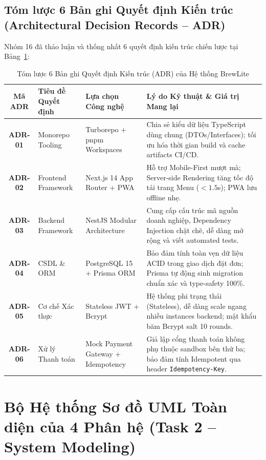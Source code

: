 \documentclass[a4paper]{article}
\begin{document}
\subsection{Tóm lược 6 Bản ghi Quyết định Kiến trúc (Architectural Decision Records -- ADR)}
Nhóm 16 đã thảo luận và thống nhất 6 quyết định kiến trúc chiến lược tại Bảng~\ref{tab:adrs}:

\begin{table}[H]
\centering
\small
\begin{tabular}{|c|>{\raggedright\arraybackslash}p{2.5cm}|>{\raggedright\arraybackslash}p{3.8cm}|>{\raggedright\arraybackslash}p{6.8cm}|}
\hline
\textbf{Mã ADR} & \textbf{Tiêu đề Quyết định} & \textbf{Lựa chọn Công nghệ} & \textbf{Lý do Kỹ thuật \& Giá trị Mang lại} \\ \hline
\textbf{ADR-01} & Monorepo Tooling & Turborepo + pnpm Workspaces & Chia sẻ kiểu dữ liệu TypeScript dùng chung (DTOs/Interfaces); tối ưu hóa thời gian build và cache artifacts CI/CD. \\ \hline
\textbf{ADR-02} & Frontend Framework & Next.js 14 App Router + PWA & Hỗ trợ Mobile-First mượt mà; Server-side Rendering tăng tốc độ tải trang Menu ($<1.5$s); PWA lưu offline nhẹ. \\ \hline
\textbf{ADR-03} & Backend Framework & NestJS Modular Architecture & Cung cấp cấu trúc mã nguồn doanh nghiệp, Dependency Injection chặt chẽ, dễ dàng mở rộng và viết automated tests. \\ \hline
\textbf{ADR-04} & CSDL \& ORM & PostgreSQL 15 + Prisma ORM & Bảo đảm tính toàn vẹn dữ liệu ACID trong giao dịch đặt đơn; Prisma tự động sinh migration chuẩn xác và type-safety 100\%. \\ \hline
\textbf{ADR-05} & Cơ chế Xác thực & Stateless JWT + Bcrypt & Hệ thống phi trạng thái (Stateless), dễ dàng scale ngang nhiều instances backend; mật khẩu băm Bcrypt salt 10 rounds. \\ \hline
\textbf{ADR-06} & Xử lý Thanh toán & Mock Payment Gateway + Idempotency & Giả lập cổng thanh toán không phụ thuộc sandbox bên thứ ba; bảo đảm tính Idempotent qua header \texttt{Idempotency-Key}. \\ \hline
\end{tabular}
\caption{Tóm lược 6 Bản ghi Quyết định Kiến trúc (ADR) của Hệ thống BrewLite}
\label{tab:adrs}
\end{table}

\newpage
\section{Bộ Hệ thống Sơ đồ UML Toàn diện của 4 Phân hệ (Task 2 -- System Modeling)}
\end{document}
